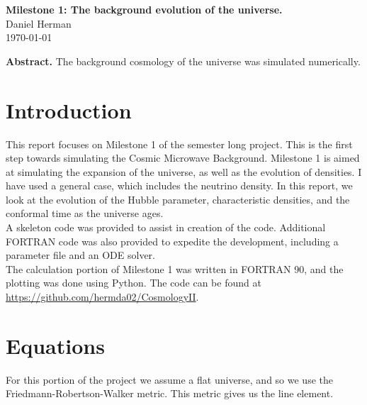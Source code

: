 \documentclass[a4paper]{article}
\begin{document}
\begin{center}
  {\Large \bf Milestone 1: The background evolution of the universe.}\\[4ex]
  {\large Daniel Herman}\\[4ex]
  \normalsize
  \today
  \vspace*{2ex}
      
  \begin{minipage}[t]{15cm}
      
  {\bf Abstract. }The background cosmology of the universe was simulated numerically.
	
  \vspace*{2ex}
  \end{minipage}

\end{center}


\section{Introduction}\label{sec:intro}

This report focuses on Milestone 1 of the semester long project. This is the first step towards simulating the Cosmic Microwave Background. Milestone 1 is aimed at simulating the expansion of the universe, as well as the evolution of densities. I have used a general case, which includes the neutrino density. In this report, we look at the evolution of the Hubble parameter, characteristic densities, and the conformal time as the universe ages.\\

A skeleton code was provided to assist in creation of the code. Additional FORTRAN code was also provided to expedite the development, including a parameter file and an ODE solver.\\

The calculation portion of Milestone 1 was written in FORTRAN 90, and the plotting was done using Python. The code can be found at \url{https://github.com/hermda02/CosmologyII}.


\section{Equations}\label{sec:equa}

For this portion of the project we assume a flat universe, and so we use the Friedmann-Robertson-Walker metric. This metric gives us the line element.
\end{document}
